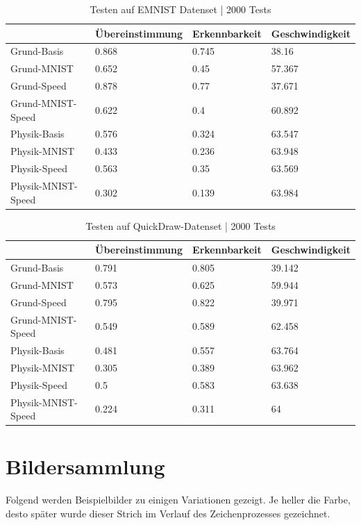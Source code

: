 \begin{table}[!ht]
    \centering
    \caption{Testen auf EMNIST Datenset | 2000 Tests}
    \begin{tabular}{|l|l|l|l|}
    \hline
        ~ & Übereinstimmung  & Erkennbarkeit  & Geschwindigkeit \\ \hline
        Grund-Basis & 0.868 & 0.745 & 38.16 \\ \hline
        Grund-MNIST & 0.652 & 0.45 & 57.367 \\ \hline
        Grund-Speed & 0.878 & 0.77 & 37.671 \\ \hline
        Grund-MNIST-Speed & 0.622 & 0.4 & 60.892 \\ \hline
        Physik-Basis & 0.576 & 0.324 & 63.547 \\ \hline
        Physik-MNIST & 0.433 & 0.236 & 63.948 \\ \hline
        Physik-Speed & 0.563 & 0.35 & 63.569 \\ \hline
        Physik-MNIST-Speed & 0.302 & 0.139 & 63.984 \\ \hline
    \end{tabular}
    \label{tab:EMNIST}
\end{table}

\begin{table}[!ht]
    \centering
    \caption{Testen auf QuickDraw-Datenset | 2000 Tests}
    \begin{tabular}{|l|l|l|l|}
    \hline
        ~ & Übereinstimmung  & Erkennbarkeit  & Geschwindigkeit \\ \hline
        Grund-Basis & 0.791 & 0.805 & 39.142 \\ \hline
        Grund-MNIST & 0.573 & 0.625 & 59.944 \\ \hline
        Grund-Speed & 0.795 & 0.822 & 39.971 \\ \hline
        Grund-MNIST-Speed & 0.549 & 0.589 & 62.458 \\ \hline
        Physik-Basis & 0.481 & 0.557 & 63.764 \\ \hline
        Physik-MNIST & 0.305 & 0.389 & 63.962 \\ \hline
        Physik-Speed & 0.5 & 0.583 & 63.638 \\ \hline
        Physik-MNIST-Speed & 0.224 & 0.311 & 64 \\ \hline
    \end{tabular}
    \label{tab:Quickdraw}
\end{table}

\newpage

\section{Bildersammlung}
Folgend werden Beispielbilder zu einigen Variationen gezeigt. Je heller die
Farbe, desto später wurde dieser Strich im Verlauf des Zeichenprozesses
gezeichnet.

